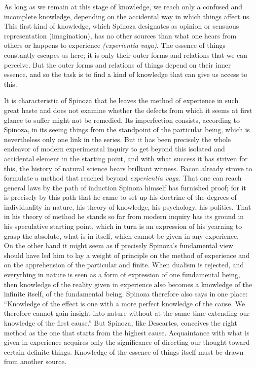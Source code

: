 \documentclass[12pt]{book}
\newcommand{\opage}[1]{\marginnote{\footnotesize\textit{[#1]}}}
\begin{document}
As long as we remain at this stage of knowledge, we reach only a confused and incomplete
knowledge, depending on the accidental way in which things affect us. This first kind
of knowledge, which Spinoza \opage{106}designates as opinion or sensuous representation
(imagination), has no other sources than what one hears from others or happens to
experience \textit{(experientia vaga)}. The essence of things constantly escapes us here;
it is only their outer forms and relations that we can perceive. But the outer forms
and relations of things depend on their inner essence, and so the task is to find a kind
of knowledge that can give us access to this.

It is characteristic of Spinoza that he leaves the method of experience in such great
haste and does not examine whether the defects from which it seems at first glance to
suffer might not be remedied. Its imperfection consists, according to Spinoza, in its
seeing things from the standpoint of the particular being, which is nevertheless only
one link in the series. But it has been precisely the whole endeavor of modern
experimental inquiry to get beyond this isolated and accidental element in the starting
point, and with what success it has striven for this, the history of natural science
bears brilliant witness. Bacon already strove to formulate a method that reached beyond
\textit{experientia vaga}. That one can reach general laws by the path of induction
Spinoza himself has furnished proof; for it is precisely by this path that he came to
set up his doctrine of the degrees of individuality in nature, his theory of knowledge,
his psychology, his politics. That in his theory of method he stands so far from modern
inquiry has its ground in his speculative starting point, which in turn is an expression
of his yearning to grasp the absolute, what is in itself, which cannot be given in any
experience.---On the other hand it might seem as if precisely Spinoza's fundamental
\opage{107}view should have led him to lay a weight of principle on the method of
experience and on the apprehension of the particular and finite. When dualism is
rejected, and everything in nature is seen as a form of expression of one fundamental
being, then knowledge of the reality given in experience also becomes a knowledge of
the infinite itself, of the fundamental being. Spinoza therefore also says in one
place: ``Knowledge of the effect is one with a more perfect knowledge of the cause. We
therefore cannot gain insight into nature without at the same time extending our
knowledge of the first cause.'' But Spinoza, like Descartes, conceives the right method
as the one that starts from the highest cause. Acquaintance with what is given in
experience acquires only the significance of directing our thought toward certain
definite things. Knowledge of the essence of things itself must be drawn from another
source.
\end{document}
